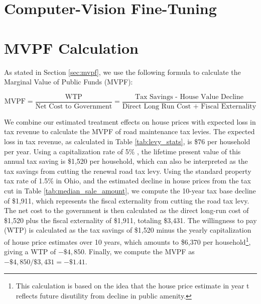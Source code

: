 
\section{Computer-Vision Fine-Tuning}


\section{MVPF Calculation}

As stated in Section \ref{sec:mvpf}, we use the following formula to calculate the Marginal Value of Public Funds (MVPF):

\begin{equation}
    \text{MVPF} = \frac{\text{WTP}}{\text{Net Cost to Government}} = \frac{\text{Tax Savings - House Value Decline}}{\text{Direct Long Run Cost + Fiscal Externality}}
\end{equation}

We combine our estimated treatment effects on house prices with expected loss in tax revenue to calculate the MVPF of road maintenance tax levies. The expected loss in tax revenue, as calculated in Table \ref{tab:levy_stats}, is \$76 per household per year. Using a capitalization rate of 5\% \citep{hilber2011economic, cellini2010value}, the lifetime present value of this annual tax saving is \$1,520 per household, which can also be interpreted as the tax savings from cutting the renewal road tax levy. Using the standard property tax rate of 1.5\% in Ohio, and the estimated decline in house prices from the tax cut in Table \ref{tab:median_sale_amount}, we compute the 10-year tax base decline of \$1,911, which represents the fiscal externality from cutting the road tax levy. The net cost to the government is then calculated as the direct long-run cost of \$1,520 plus the fiscal externality of \$1,911, totaling \$3,431. The willingness to pay (WTP) is calculated as the tax savings of \$1,520 minus the yearly capitalization of house price estimates over 10 years, which amounts to \$6,370 per household\footnote{This calculation is based on the idea that the house price estimate in year t reflects future disutility from decline in public amenity.}, giving a WTP of \(-\$4,850\). Finally, we compute the MVPF as \(-\$4,850 / \$3,431 = -\$1.41\). 



